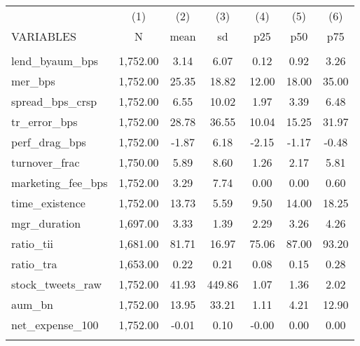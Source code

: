 \documentclass[]{article}
\begin{document}
\begin{tabular}{lcccccc} \hline
 & (1) & (2) & (3) & (4) & (5) & (6) \\
VARIABLES & N & mean & sd & p25 & p50 & p75 \\ \hline
 &  &  &  &  &  &  \\
lend\_byaum\_bps & 1,752.00 & 3.14 & 6.07 & 0.12 & 0.92 & 3.26 \\
mer\_bps & 1,752.00 & 25.35 & 18.82 & 12.00 & 18.00 & 35.00 \\
spread\_bps\_crsp & 1,752.00 & 6.55 & 10.02 & 1.97 & 3.39 & 6.48 \\
tr\_error\_bps & 1,752.00 & 28.78 & 36.55 & 10.04 & 15.25 & 31.97 \\
perf\_drag\_bps & 1,752.00 & -1.87 & 6.18 & -2.15 & -1.17 & -0.48 \\
turnover\_frac & 1,750.00 & 5.89 & 8.60 & 1.26 & 2.17 & 5.81 \\
marketing\_fee\_bps & 1,752.00 & 3.29 & 7.74 & 0.00 & 0.00 & 0.60 \\
time\_existence & 1,752.00 & 13.73 & 5.59 & 9.50 & 14.00 & 18.25 \\
mgr\_duration & 1,697.00 & 3.33 & 1.39 & 2.29 & 3.26 & 4.26 \\
ratio\_tii & 1,681.00 & 81.71 & 16.97 & 75.06 & 87.00 & 93.20 \\
ratio\_tra & 1,653.00 & 0.22 & 0.21 & 0.08 & 0.15 & 0.28 \\
stock\_tweets\_raw & 1,752.00 & 41.93 & 449.86 & 1.07 & 1.36 & 2.02 \\
aum\_bn & 1,752.00 & 13.95 & 33.21 & 1.11 & 4.21 & 12.90 \\
net\_expense\_100 & 1,752.00 & -0.01 & 0.10 & -0.00 & 0.00 & 0.00 \\
 &  &  &  &  &  &  \\ \hline
\end{tabular}
\end{document}
